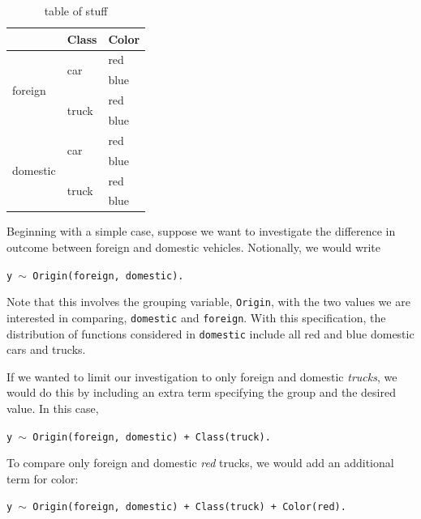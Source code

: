 \documentclass{article}
\newcommand{\xt}{\texttt}%
\begin{document}
\begin{table}
\centering
\def\arraystretch{1.5}
\begin{tabular}{|p{0.9in}|p{0.9in}|p{0.9in}|} \hline 
\rowcolor{lightgray} \multicolumn{1}{|c|}{Origin} & \multicolumn{1}{c|}{Class} & \multicolumn{1}{c|}{Color}\\
\hline
\multirow{4}{*}{foreign} & \multirow{2}{*}{car} & red \\
\hhline{~~-}
& & blue \\
\hhline{~--}
& \multirow{2}{*}{truck} & red \\
\hhline{~~-}
& & blue \\
\hline
\multirow{4}{*}{domestic} & \multirow{2}{*}{car} & red \\
\hhline{~~-}
& & blue \\
\hhline{~--}
& \multirow{2}{*}{truck} & red \\
\hhline{~~-}
& & blue \\
\hline
\end{tabular}
\caption{table of stuff}
\label{tab:group_table}
\end{table}


Beginning with a simple case, suppose we want to investigate the difference in outcome between foreign and domestic vehicles. Notionally, we would write

\begin{center}
\tt y $\sim$ Origin(foreign, domestic).
\end{center}


Note that this involves the grouping variable, \xt{Origin}, with the two values we are interested in comparing, \xt{domestic} and \xt{foreign}. With this specification, the distribution of functions considered in \xt{domestic} include all red and blue domestic cars and trucks.


If we wanted to limit our investigation to only foreign and domestic \textit{trucks}, we would do this by including an extra term specifying the group and the desired value. In this case, 

\begin{center}
\tt y $\sim$ Origin(foreign, domestic) + Class(truck).
\end{center}
To compare only foreign and domestic \textit{red} trucks, we would add an additional term for color:

\begin{center}
\tt y $\sim$ Origin(foreign, domestic) + Class(truck) + Color(red).
\end{center}
\end{document}
